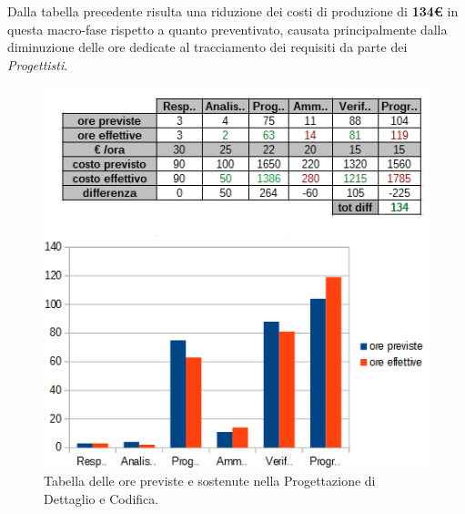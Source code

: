 \clearpage
Dalla tabella precedente risulta una riduzione dei costi di produzione di \textbf{134€} in questa macro-fase rispetto a quanto preventivato, causata principalmente dalla diminuzione delle ore dedicate al tracciamento dei requisiti da parte dei \textit{Progettisti}.

\begin{figure}[H]
\begin{center}
\includegraphics[scale=0.67]{img/consuntivo-progdet-tot.png}
\caption{Tabella delle ore previste e sostenute nella Progettazione di Dettaglio e Codifica.}
\end{center}
\end{figure}

